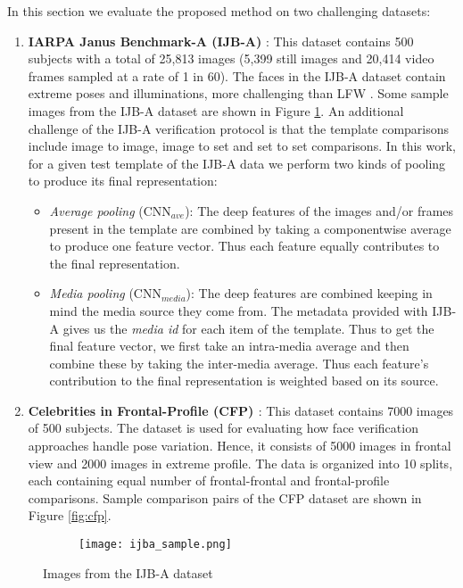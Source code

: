 \documentclass[10pt,twocolumn,letterpaper]{article}
\begin{document}
In this section we evaluate the proposed method on two challenging datasets: 
\begin{enumerate}[leftmargin=*]
\item \textbf{IARPA Janus Benchmark-A (IJB-A)}  \textbf{\cite{ijba15}}: This dataset contains 500
  subjects with a total of 25,813 images (5,399 still images and 20,414 video
  frames sampled at a rate of 1 in 60). The faces in the IJB-A dataset contain
  extreme poses and illuminations, more challenging than LFW \cite{lfw}.  Some sample images from the IJB-A dataset are shown in Figure \ref{fig:ijba-sample}. An additional challenge of the IJB-A verification protocol is that the template comparisons include image to image, image to set and set to set comparisons. In this work, for a given test template of the IJB-A data we perform two kinds of pooling to produce its final representation:

\begin{itemize}[leftmargin=*]
\item  \textit{Average pooling} (CNN$_{ave}$): The deep features of the images and/or
  frames present in the template are combined by taking a componentwise average
  to produce one feature vector. Thus each feature equally contributes to the
  final representation. 
\item  \textit{Media pooling} (CNN$_{media}$): The deep features are combined keeping in
  mind the media source they come from. The metadata provided with IJB-A gives
  us the \textit{media id} for each item of the template. Thus to get the final
  feature vector, we first take an intra-media average and then combine these by
  taking the inter-media average. Thus each feature's  contribution to the final
  representation is weighted based on its source.
\end{itemize}

 \item \textbf{Celebrities in Frontal-Profile (CFP) \cite{cfpw}}: This dataset
  contains 7000 images of 500 subjects. The dataset is used for evaluating how
  face verification approaches handle pose variation. Hence, it consists of 5000
  images in frontal view and 2000 images in extreme profile. The data is
  organized into 10 splits, each containing equal number of frontal-frontal and
  frontal-profile comparisons. Sample comparison pairs of the CFP dataset are
  shown in Figure \ref{fig:cfp}.  
\end{enumerate}


\begin{figure}
\begin{subfigure}{.5\textwidth}
\centering
\texttt{[image: ijba\_sample.png]}
\end{subfigure}
\caption{Images from the IJB-A dataset}
\label{fig:ijba-sample}
\end{figure}
  
\end{document}
